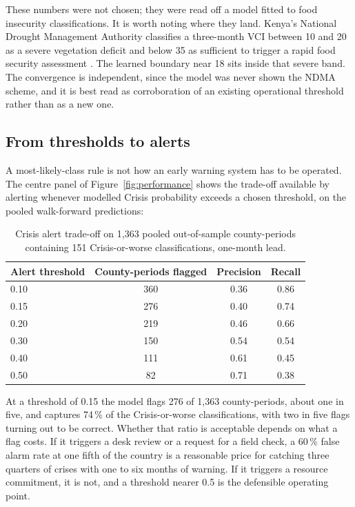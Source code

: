 \documentclass[11pt]{article}
\begin{document}
These numbers were not chosen; they were read off a model fitted to food
insecurity classifications. It is worth noting where they land. Kenya's National
Drought Management Authority classifies a three-month VCI between 10 and 20 as a
severe vegetation deficit and below 35 as sufficient to trigger a rapid food
security assessment \cite{barrett2020,klisch2016}. The learned boundary near 18
sits inside that severe band. The convergence is independent, since the model was
never shown the NDMA scheme, and it is best read as corroboration of an existing
operational threshold rather than as a new one.

\subsection{From thresholds to alerts}

A most-likely-class rule is not how an early warning system has to be operated.
The centre panel of Figure~\ref{fig:performance} shows the trade-off available by
alerting whenever modelled Crisis probability exceeds a chosen threshold, on the
pooled walk-forward predictions:

\begin{table}[h]
\centering
\caption{Crisis alert trade-off on 1,363 pooled out-of-sample county-periods
containing 151 Crisis-or-worse classifications, one-month lead.}
\label{tab:alert}
\small
\begin{tabular}{lccc}
\toprule
Alert threshold & County-periods flagged & Precision & Recall \\
\midrule
0.10 & 360 & 0.36 & 0.86 \\
0.15 & 276 & 0.40 & 0.74 \\
0.20 & 219 & 0.46 & 0.66 \\
0.30 & 150 & 0.54 & 0.54 \\
0.40 & 111 & 0.61 & 0.45 \\
0.50 &  82 & 0.71 & 0.38 \\
\bottomrule
\end{tabular}
\end{table}

At a threshold of 0.15 the model flags 276 of 1,363 county-periods, about one in
five, and captures 74\,\% of the Crisis-or-worse classifications, with two in five
flags turning out to be correct. Whether that ratio is acceptable depends on what
a flag costs. If it triggers a desk review or a request for a field check, a
60\,\% false alarm rate at one fifth of the country is a reasonable price for
catching three quarters of crises with one to six months of warning. If it
triggers a resource commitment, it is not, and a threshold nearer 0.5 is the
defensible operating point.
\end{document}
